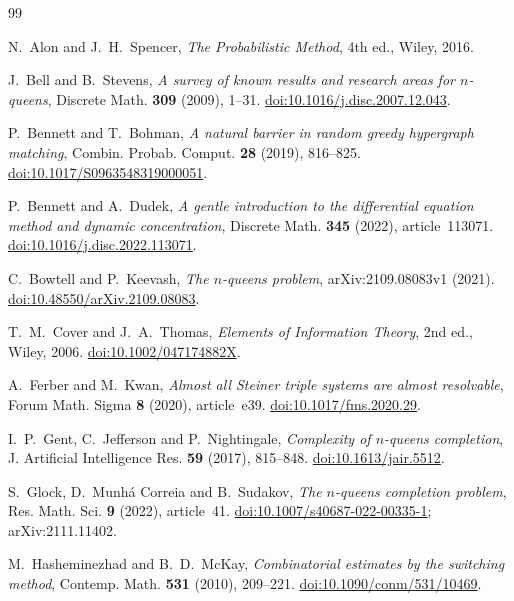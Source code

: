 \begin{thebibliography}{99}
{}
\raggedright

 N.~Alon and J.~H.~Spencer, \emph{The Probabilistic Method}, 4th ed.,
Wiley, 2016.

 J.~Bell and B.~Stevens, \emph{A survey of known results and research areas
for $n$-queens}, Discrete Math. \textbf{309} (2009), 1--31.
\href{https://doi.org/10.1016/j.disc.2007.12.043}{doi:10.1016/j.disc.2007.12.043}.

 P.~Bennett and T.~Bohman, \emph{A natural barrier in random greedy hypergraph
matching}, Combin. Probab. Comput. \textbf{28} (2019), 816--825.
\href{https://doi.org/10.1017/S0963548319000051}{doi:10.1017/S0963548319000051}.

 P.~Bennett and A.~Dudek, \emph{A gentle introduction to the differential
equation method and dynamic concentration}, Discrete Math. \textbf{345} (2022), article~113071.
\href{https://doi.org/10.1016/j.disc.2022.113071}{doi:10.1016/j.disc.2022.113071}.

 C.~Bowtell and P.~Keevash, \emph{The $n$-queens problem}, arXiv:2109.08083v1 (2021).
\href{https://doi.org/10.48550/arXiv.2109.08083}{doi:10.48550/arXiv.2109.08083}.

 T.~M.~Cover and J.~A.~Thomas, \emph{Elements of Information Theory},
2nd ed., Wiley, 2006. \href{https://doi.org/10.1002/047174882X}{doi:10.1002/047174882X}.

 A.~Ferber and M.~Kwan, \emph{Almost all Steiner triple systems are almost
resolvable}, Forum Math. Sigma \textbf{8} (2020), article~e39.
\href{https://doi.org/10.1017/fms.2020.29}{doi:10.1017/fms.2020.29}.

 I.~P.~Gent, C.~Jefferson and P.~Nightingale, \emph{Complexity of $n$-queens completion},
J. Artificial Intelligence Res. \textbf{59} (2017), 815--848.
\href{https://doi.org/10.1613/jair.5512}{doi:10.1613/jair.5512}.

 S.~Glock, D.~Munhá Correia and B.~Sudakov, \emph{The $n$-queens completion problem},
Res. Math. Sci. \textbf{9} (2022), article~41.
\href{https://doi.org/10.1007/s40687-022-00335-1}{doi:10.1007/s40687-022-00335-1};
arXiv:2111.11402.

 M.~Hasheminezhad and B.~D.~McKay, \emph{Combinatorial estimates by the switching
method}, Contemp. Math. \textbf{531} (2010), 209--221.
\href{https://doi.org/10.1090/conm/531/10469}{doi:10.1090/conm/531/10469}.


\end{thebibliography}
